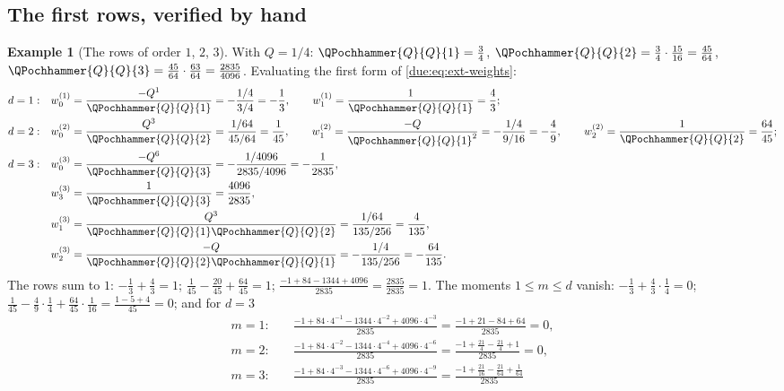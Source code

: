 \documentclass[11pt,oneside]{article}
\theoremstyle{plain}
\theoremstyle{definition}
\newtheorem{example}[theorem]{Example}
\theoremstyle{remark}
\newcommand{\Qq}{Q}                                         %
\newcommand{\Wrow}[2]{w^{(#1)}_{#2}}                        %
\begin{document}
\subsection{The first rows, verified by hand}

\begin{example}[The rows of order $1$, $2$, $3$]
\label{due:ex:ext-hand}
With $\Qq=1/4$: $\QPochhammer{\Qq}{\Qq}{1}=\tfrac34$,
$\QPochhammer{\Qq}{\Qq}{2}=\tfrac34\cdot\tfrac{15}{16}=\tfrac{45}{64}$,
$\QPochhammer{\Qq}{\Qq}{3}=\tfrac{45}{64}\cdot\tfrac{63}{64}=\tfrac{2835}{4096}$.
Evaluating the first form of \cref{due:eq:ext-weights}:
\begin{align*}
 d=1:&\quad
 \Wrow{1}{0}=\frac{-\Qq^{1}}{\QPochhammer{\Qq}{\Qq}{1}}=-\frac{1/4}{3/4}=-\frac13,
 \qquad
 \Wrow{1}{1}=\frac{1}{\QPochhammer{\Qq}{\Qq}{1}}=\frac43;\\
 d=2:&\quad
 \Wrow{2}{0}=\frac{\Qq^{3}}{\QPochhammer{\Qq}{\Qq}{2}}=\frac{1/64}{45/64}=\frac1{45},
 \qquad
 \Wrow{2}{1}=\frac{-\Qq}{\QPochhammer{\Qq}{\Qq}{1}^{2}}=-\frac{1/4}{9/16}=-\frac49,
 \qquad
 \Wrow{2}{2}=\frac{1}{\QPochhammer{\Qq}{\Qq}{2}}=\frac{64}{45};\\
 d=3:&\quad
 \Wrow{3}{0}=\frac{-\Qq^{6}}{\QPochhammer{\Qq}{\Qq}{3}}=-\frac{1/4096}{2835/4096}=-\frac1{2835},\\
 &\quad
 \Wrow{3}{3}=\frac{1}{\QPochhammer{\Qq}{\Qq}{3}}=\frac{4096}{2835},\\
 &\quad
 \Wrow{3}{1}=\frac{\Qq^{3}}{\QPochhammer{\Qq}{\Qq}{1}\QPochhammer{\Qq}{\Qq}{2}}
 =\frac{1/64}{135/256}=\frac4{135},\\
 &\quad
 \Wrow{3}{2}=\frac{-\Qq}{\QPochhammer{\Qq}{\Qq}{2}\QPochhammer{\Qq}{\Qq}{1}}
 =-\frac{1/4}{135/256}=-\frac{64}{135}.
\end{align*}
The rows sum to $1$: $-\tfrac13+\tfrac43=1$;
$\tfrac1{45}-\tfrac{20}{45}+\tfrac{64}{45}=1$;
$\tfrac{-1+84-1344+4096}{2835}=\tfrac{2835}{2835}=1$.  The moments
$1\le m\le d$ vanish: $-\tfrac13+\tfrac43\cdot\tfrac14=0$;
$\tfrac1{45}-\tfrac49\cdot\tfrac14+\tfrac{64}{45}\cdot\tfrac1{16}
=\tfrac{1-5+4}{45}=0$; and for $d=3$
\begin{align*}
 m=1:&\quad
 \frac{-1+84\cdot4^{-1}-1344\cdot4^{-2}+4096\cdot4^{-3}}{2835}
 =\frac{-1+21-84+64}{2835}=0,\\
 m=2:&\quad
 \frac{-1+84\cdot4^{-2}-1344\cdot4^{-4}+4096\cdot4^{-6}}{2835}
 =\frac{-1+\frac{21}{4}-\frac{21}{4}+1}{2835}=0,\\
 m=3:&\quad
 \frac{-1+84\cdot4^{-3}-1344\cdot4^{-6}+4096\cdot4^{-9}}{2835}
 =\frac{-1+\frac{21}{16}-\frac{21}{64}+\frac{1}{64}}{2835}\\

\end{align*}
\end{example}
\end{document}
